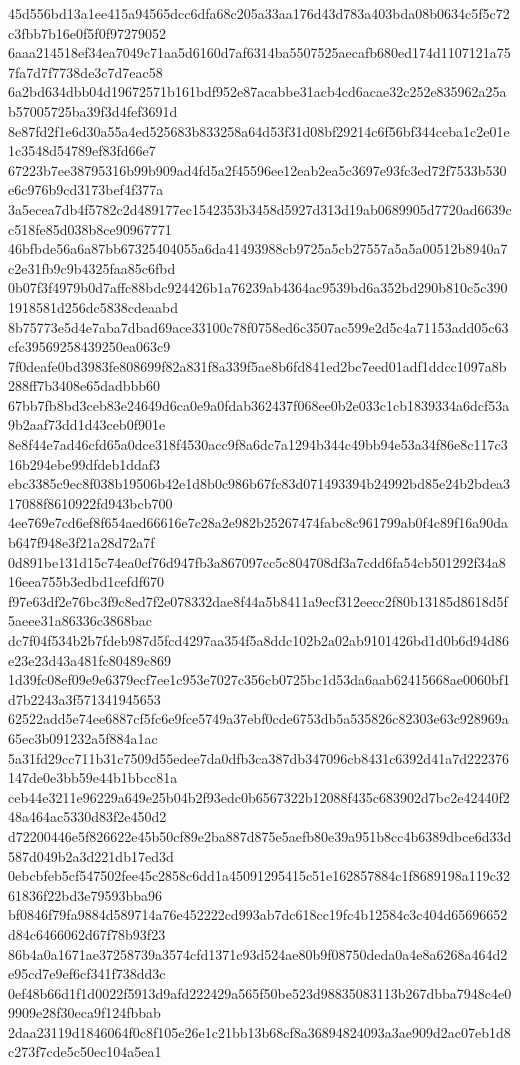 {45d556bd13a1ee415a94565dcc6dfa68c205a33aa176d43d783a403bda08b0634c5f5c72c3fbb7b16e0f5f0f97279052
6aaa214518ef34ea7049c71aa5d6160d7af6314ba5507525aecafb680ed174d1107121a757fa7d7f7738de3c7d7eac58
6a2bd634dbb04d19672571b161bdf952e87acabbe31acb4cd6acae32c252e835962a25ab57005725ba39f3d4fef3691d
8e87fd2f1e6d30a55a4ed525683b833258a64d53f31d08bf29214c6f56bf344ceba1c2e01e1c3548d54789ef83fd66e7
67223b7ee38795316b99b909ad4fd5a2f45596ee12eab2ea5c3697e93fc3ed72f7533b530e6c976b9cd3173bef4f377a
3a5ecea7db4f5782c2d489177ec1542353b3458d5927d313d19ab0689905d7720ad6639cc518fe85d038b8ce90967771
46bfbde56a6a87bb67325404055a6da41493988cb9725a5cb27557a5a5a00512b8940a7c2e31fb9c9b4325faa85c6fbd
0b07f3f4979b0d7affc88bdc924426b1a76239ab4364ac9539bd6a352bd290b810c5c3901918581d256dc5838cdeaabd
8b75773e5d4e7aba7dbad69ace33100c78f0758ed6c3507ac599e2d5c4a71153add05c63cfc39569258439250ea063c9
7f0deafe0bd3983fe808699f82a831f8a339f5ae8b6fd841ed2bc7eed01adf1ddcc1097a8b288ff7b3408e65dadbbb60
67bb7fb8bd3ceb83e24649d6ca0e9a0fdab362437f068ee0b2e033c1cb1839334a6dcf53a9b2aaf73dd1d43ceb0f901e
8e8f44e7ad46cfd65a0dce318f4530acc9f8a6dc7a1294b344c49bb94e53a34f86e8c117c316b294ebe99dfdeb1ddaf3
ebc3385c9ec8f038b19506b42e1d8b0c986b67fc83d071493394b24992bd85e24b2bdea317088f8610922fd943bcb700
4ee769e7cd6ef8f654aed66616e7c28a2e982b25267474fabc8c961799ab0f4c89f16a90dab647f948e3f21a28d72a7f
0d891be131d15c74ea0cf76d947fb3a867097cc5c804708df3a7cdd6fa54cb501292f34a816eea755b3edbd1cefdf670
f97e63df2e76bc3f9c8ed7f2e078332dae8f44a5b8411a9ecf312eecc2f80b13185d8618d5f5aeee31a86336c3868bac
dc7f04f534b2b7fdeb987d5fcd4297aa354f5a8ddc102b2a02ab9101426bd1d0b6d94d86e23e23d43a481fc80489c869
1d39fc08ef09e9e6379ecf7ee1c953e7027c356cb0725bc1d53da6aab62415668ae0060bf1d7b2243a3f571341945653
62522add5e74ee6887cf5fc6e9fce5749a37ebf0cde6753db5a535826c82303e63c928969a65ec3b091232a5f884a1ac
5a31fd29cc711b31c7509d55edee7da0dfb3ca387db347096cb8431c6392d41a7d222376147de0e3bb59e44b1bbcc81a
ceb44e3211e96229a649e25b04b2f93edc0b6567322b12088f435c683902d7bc2e42440f248a464ac5330d83f2e450d2
d72200446e5f826622e45b50cf89e2ba887d875e5aefb80e39a951b8cc4b6389dbce6d33d587d049b2a3d221db17ed3d
0ebcbfeb5cf547502fee45c2858c6dd1a45091295415c51e162857884c1f8689198a119c3261836f22bd3e79593bba96
bf0846f79fa9884d589714a76e452222cd993ab7dc618cc19fc4b12584c3c404d65696652d84c6466062d67f78b93f23
86b4a0a1671ae37258739a3574cfd1371c93d524ae80b9f08750deda0a4e8a6268a464d2e95cd7e9ef6cf341f738dd3c
0ef48b66d1f1d0022f5913d9afd222429a565f50be523d98835083113b267dbba7948c4e09909e28f30eca9f124fbbab
2daa23119d1846064f0c8f105e26e1c21bb13b68cf8a36894824093a3ae909d2ac07eb1d8c273f7cde5c50ec104a5ea1
}
